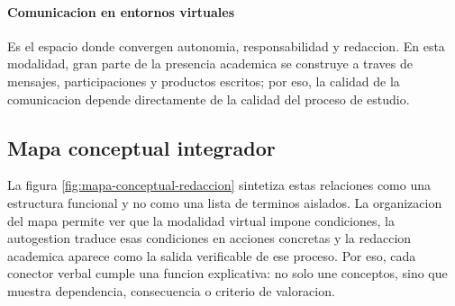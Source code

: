 \documentclass[
	spanish,
	letterpaper, oneside
]{article}
\begin{document}
\paragraph{Comunicacion en entornos virtuales}
Es el espacio donde convergen autonomia, responsabilidad y redaccion. En esta modalidad, gran parte de la presencia academica se construye a traves de mensajes, participaciones y productos escritos; por eso, la calidad de la comunicacion depende directamente de la calidad del proceso de estudio.

\subsection{Mapa conceptual integrador}

La figura \ref{fig:mapa-conceptual-redaccion} sintetiza estas relaciones como una estructura funcional y no como una lista de terminos aislados. La organizacion del mapa permite ver que la modalidad virtual impone condiciones, la autogestion traduce esas condiciones en acciones concretas y la redaccion academica aparece como la salida verificable de ese proceso. Por eso, cada conector verbal cumple una funcion explicativa: no solo une conceptos, sino que muestra dependencia, consecuencia o criterio de valoracion.
\end{document}
